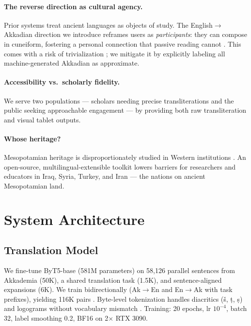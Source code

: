 \documentclass[11pt]{article}
\begin{document}
\paragraph{The reverse direction as cultural agency.}
Prior systems treat ancient languages as objects of study.
The English$\rightarrow$Akkadian direction we introduce reframes users as \textit{participants}: they can compose in cuneiform, fostering a personal connection that passive reading cannot \cite{luo2024digitization}.
This comes with a risk of trivialization \cite{bender2021dangers}; we mitigate it by explicitly labeling all machine-generated Akkadian as approximate.

\paragraph{Accessibility vs.\ scholarly fidelity.}
We serve two populations --- scholars needing precise transliterations and the public seeking approachable engagement \cite{terras2022digitisation} --- by providing both raw transliteration and visual tablet outputs.

\paragraph{Whose heritage?}
Mesopotamian heritage is disproportionately studied in Western institutions \cite{rayne2017cultural}.
An open-source, multilingual-extensible toolkit lowers barriers for researchers and educators in Iraq, Syria, Turkey, and Iran --- the nations on ancient Mesopotamian land.

\section{System Architecture}

\subsection{Translation Model}

We fine-tune ByT5-base \cite{xue2022byt5} (581M parameters) on 58,126 parallel sentences from Akkademia \cite{gutherz2023translating} (50K), a shared translation task \cite{deeppast2026} (1.5K), and sentence-aligned expansions (6K).
We train bidirectionally (Ak$\rightarrow$En and En$\rightarrow$Ak with task prefixes), yielding 116K pairs \cite{sennrich2016improving}.
Byte-level tokenization handles diacritics (\v{s}, \d{t}, \d{s}) and logograms without vocabulary mismatch \cite{sahala2025byt5cuneiform}.
Training: 20 epochs, lr $10^{-4}$, batch 32, label smoothing 0.2, BF16 on 2$\times$ RTX 3090.
\end{document}
